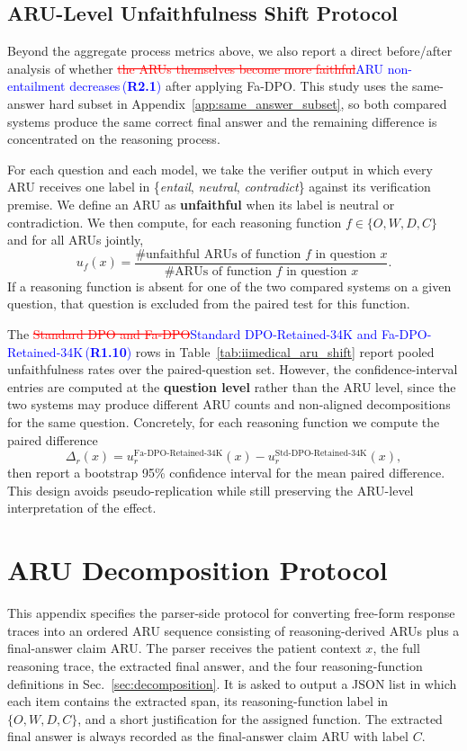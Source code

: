 \documentclass[a4paper,fleqn,doubleblind]{cas-sc}
\DeclareRobustCommand{\deleted}[1]{\textcolor{red}{\sout{#1}}}
\DeclareRobustCommand{\added}[1]{\textcolor{blue}{#1}}
\DeclareRobustCommand{\revtag}[1]{\textcolor{blue}{\scriptsize\,(\textbf{#1})}}
\begin{document}
\subsection{ARU-Level Unfaithfulness Shift Protocol}
\label{app:aru_shift_protocol}

Beyond the aggregate process metrics above, we also report a direct before/after analysis of whether \deleted{the ARUs themselves become more faithful}\added{ARU non-entailment decreases}\revtag{R2.1} after applying Fa-DPO. This study uses the same-answer hard subset in Appendix~\ref{app:same_answer_subset}, so both compared systems produce the same correct final answer and the remaining difference is concentrated on the reasoning process.

For each question and each model, we take the verifier output in which every ARU receives one label in \{\textit{entail}, \textit{neutral}, \textit{contradict}\} against its verification premise. We define an ARU as \textbf{unfaithful} when its label is neutral or contradiction. We then compute, for each reasoning function $f \in \{O,W,D,C\}$ and for all ARUs jointly,
\[
u_f(x) = \frac{\# \text{unfaithful ARUs of function } f \text{ in question } x}{\# \text{ARUs of function } f \text{ in question } x}.
\]
If a reasoning function is absent for one of the two compared systems on a given question, that question is excluded from the paired test for this function.

The \deleted{Standard DPO and Fa-DPO}\added{Standard DPO-Retained-34K and Fa-DPO-Retained-34K}\revtag{R1.10} rows in Table~\ref{tab:iimedical_aru_shift} report pooled unfaithfulness rates over the paired-question set. However, the confidence-interval entries are computed at the \textbf{question level} rather than the ARU level, since the two systems may produce different ARU counts and non-aligned decompositions for the same question. Concretely, for each reasoning function we compute the paired difference
\[
\Delta_r(x) = u_r^{\text{Fa-DPO-Retained-34K}}(x) - u_r^{\text{Std-DPO-Retained-34K}}(x),
\]
then report a bootstrap 95\% confidence interval for the mean paired difference. This design avoids pseudo-replication while still preserving the ARU-level interpretation of the effect.

\section{ARU Decomposition Protocol}
\label{app:aru_protocol}

This appendix specifies the parser-side protocol for converting free-form response traces into an ordered ARU sequence consisting of reasoning-derived ARUs plus a final-answer claim ARU. The parser receives the patient context $x$, the full reasoning trace, the extracted final answer, and the four reasoning-function definitions in Sec.~\ref{sec:decomposition}. It is asked to output a JSON list in which each item contains the extracted span, its reasoning-function label in $\{O,W,D,C\}$, and a short justification for the assigned function. The extracted final answer is always recorded as the final-answer claim ARU with label $C$.
\end{document}
